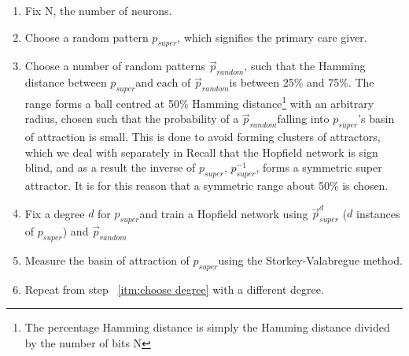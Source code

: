 \begin{enumerate}

\newcommand{\psuper}{$p_{super}$}
\newcommand{\prandom}{$\overrightarrow{p}_{random}$}

\item Fix N, the number of neurons.

\item Choose a random pattern \psuper, which signifies the primary care giver.

\item Choose a number of random patterns \prandom, such that the Hamming distance between \psuper and each of \prandom is between 25\% and 75\%. The range forms a ball centred at 50\% Hamming distance\footnote{The percentage Hamming distance is simply the Hamming distance divided by the number of bits N} with an arbitrary radius, chosen such that the probability of a \prandom falling into \psuper's basin of attraction is small. This is done to avoid forming clusters of attractors, which we deal with separately in  Recall that the Hopfield network is sign blind, and as a result the inverse of \psuper, $p_{super}^{-1}$, forms a symmetric super attractor. It is for this reason that a symmetric range about 50\% is chosen.

\item \label{itm:choose degree} Fix a degree $d$ for \psuper and train a Hopfield network using $\overrightarrow{p}^d_{super}$ ($d$ instances of \psuper) and \prandom

\item Measure the basin of attraction of \psuper using the Storkey-Valabregue method. 

\item Repeat from step ~\ref{itm:choose degree} with a different degree.

\end{enumerate}


\let\psuper\undefined
\let\prandom\undefined




